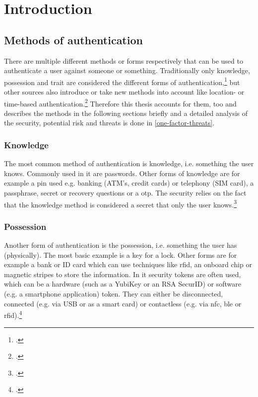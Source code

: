 \chapter{Introduction}

\blindtext

\section{Methods of authentication}
There are multiple different methods or forms respectively that can be used to authenticate a user against someone or something. Traditionally only knowledge, possession and trait are considered the different forms of authentication,\footcites[See][299]{10.2307/27845364}[See][140]{brotherston2017defensive}[][47]{anderson2008security} but other sources also introduce or take new methods into account like location- or time-based authentication.\footcites[][]{6296127}[See][191]{dasgupta2017multi} Therefore this thesis accounts for them, too and describes the methods in the following sections briefly and a detailed analysis of the security, potential risk and threats is done in \autoref{one-factor-threats}.

\subsection{Knowledge}

The most common method of authentication is knowledge, i.e. \frqq something the user knows\flqq{}. Commonly used in \gls{it} are passwords. Other forms of knowledge are for example a \gls{pin} used e.g. banking (ATM's, credit cards) or telephony (SIM card), a passphrase, secret or recovery questions or a \gls{otp}. The security relies on the fact that the knowledge method is considered a secret that only the user knows.\footcite[See][467]{eckert-it-sec-9}

\subsection{Possession}

Another form of authentication is the possession, i.e. \frqq something the user has\flqq{} (physically). The most basic example is a key for a lock. Other forms are for example a bank or ID card which can use techniques like \gls{rfid}, an onboard chip or magnetic stripes to store the information. In \gls{it} security tokens are often used, which can be a hardware (such as a YubiKey or an RSA SecurID) or software (e.g. a smartphone application) token. They can either be disconnected, connected (e.g. via USB or as a smart card) or contactless (e.g. via \gls{nfc}, \gls{ble} or \gls{rfid}).\footcites[See][24]{265831}[][]{Dressel:2019:SZT:3319499.3328225}[See][8--11]{1698485}

